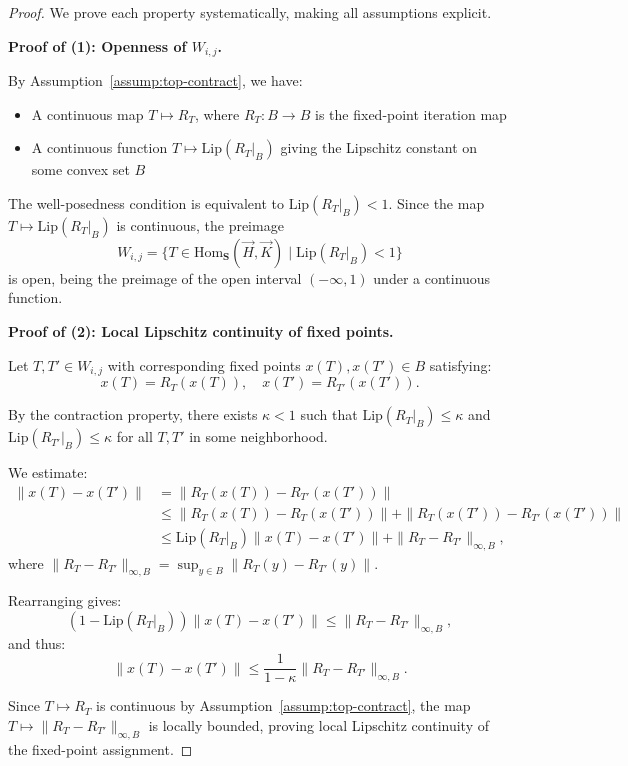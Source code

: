 \documentclass[11pt]{article}
\begin{document}
\begin{proof}
We prove each property systematically, making all assumptions explicit.

\medskip\noindent\textbf{Proof of (1): Openness of $W_{i,j}$.}

By Assumption~\ref{assump:top-contract}, we have:
\begin{itemize}
    \item A continuous map $T \mapsto R_T$, where $R_T: B \to B$ is the fixed-point iteration map
    \item A continuous function $T \mapsto \mathrm{Lip}(R_T|_B)$ giving the Lipschitz constant on some convex set $B$
\end{itemize}

The well-posedness condition is equivalent to $\mathrm{Lip}(R_T|_B) < 1$. Since the map $T \mapsto \mathrm{Lip}(R_T|_B)$ is continuous, the preimage
\[
W_{i,j} = \{T \in \mathrm{Hom}_{\mathbf S}(\vec H,\vec K) \mid \mathrm{Lip}(R_T|_B) < 1\}
\]
is open, being the preimage of the open interval $(-\infty, 1)$ under a continuous function.

\medskip\noindent\textbf{Proof of (2): Local Lipschitz continuity of fixed points.}

Let $T, T' \in W_{i,j}$ with corresponding fixed points $x(T), x(T') \in B$ satisfying:
\[
x(T) = R_T(x(T)), \quad x(T') = R_{T'}(x(T')).
\]

By the contraction property, there exists $\kappa < 1$ such that $\mathrm{Lip}(R_T|_B) \leq \kappa$ and $\mathrm{Lip}(R_{T'}|_B) \leq \kappa$ for all $T, T'$ in some neighborhood.

We estimate:
\[
\begin{aligned}
\|x(T) - x(T')\| 
&= \|R_T(x(T)) - R_{T'}(x(T'))\| \\
&\leq \|R_T(x(T)) - R_T(x(T'))\| + \|R_T(x(T')) - R_{T'}(x(T'))\| \\
&\leq \mathrm{Lip}(R_T|_B) \|x(T) - x(T')\| + \|R_T - R_{T'}\|_{\infty,B},
\end{aligned}
\]
where $\|R_T - R_{T'}\|_{\infty,B} = \sup_{y \in B} \|R_T(y) - R_{T'}(y)\|$.

Rearranging gives:
\[
(1 - \mathrm{Lip}(R_T|_B)) \|x(T) - x(T')\| \leq \|R_T - R_{T'}\|_{\infty,B},
\]
and thus:
\[
\|x(T) - x(T')\| \leq \frac{1}{1-\kappa} \|R_T - R_{T'}\|_{\infty,B}.
\]

Since $T \mapsto R_T$ is continuous by Assumption~\ref{assump:top-contract}, the map $T \mapsto \|R_T - R_{T'}\|_{\infty,B}$ is locally bounded, proving local Lipschitz continuity of the fixed-point assignment.


\end{proof}
\end{document}
